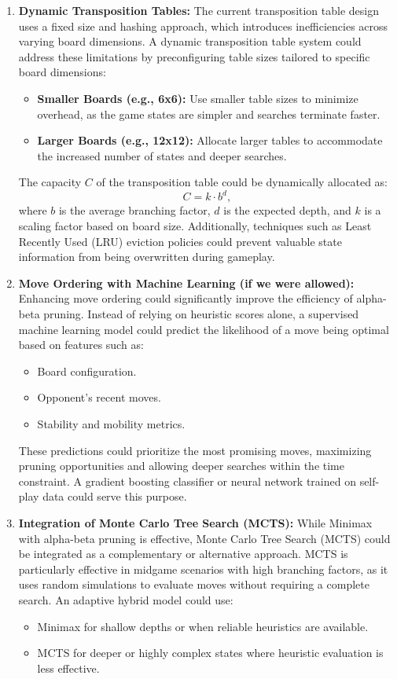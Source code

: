\documentclass[11pt]{article}
\begin{document}
\begin{enumerate}
    \item \textbf{Dynamic Transposition Tables:}
    The current transposition table design uses a fixed size and hashing approach, which introduces inefficiencies across varying board dimensions. A dynamic transposition table system could address these limitations by preconfiguring table sizes tailored to specific board dimensions:
    \begin{itemize}
        \item \textbf{Smaller Boards (e.g., 6x6):} Use smaller table sizes to minimize overhead, as the game states are simpler and searches terminate faster.
        \item \textbf{Larger Boards (e.g., 12x12):} Allocate larger tables to accommodate the increased number of states and deeper searches.
    \end{itemize}
    The capacity \(C\) of the transposition table could be dynamically allocated as:
    \[
    C = k \cdot b^d,
    \]
    where \(b\) is the average branching factor, \(d\) is the expected depth, and \(k\) is a scaling factor based on board size. Additionally, techniques such as Least Recently Used (LRU) eviction policies could prevent valuable state information from being overwritten during gameplay.

    \item \textbf{Move Ordering with Machine Learning (if we were allowed):}
    Enhancing move ordering could significantly improve the efficiency of alpha-beta pruning. Instead of relying on heuristic scores alone, a supervised machine learning model could predict the likelihood of a move being optimal based on features such as:
    \begin{itemize}
        \item Board configuration.
        \item Opponent’s recent moves.
        \item Stability and mobility metrics.
    \end{itemize}
    These predictions could prioritize the most promising moves, maximizing pruning opportunities and allowing deeper searches within the time constraint. A gradient boosting classifier or neural network trained on self-play data could serve this purpose.

    \item \textbf{Integration of Monte Carlo Tree Search (MCTS):}
    While Minimax with alpha-beta pruning is effective, Monte Carlo Tree Search (MCTS) could be integrated as a complementary or alternative approach. MCTS is particularly effective in midgame scenarios with high branching factors, as it uses random simulations to evaluate moves without requiring a complete search. An adaptive hybrid model could use:
    \begin{itemize}
        \item Minimax for shallow depths or when reliable heuristics are available.
        \item MCTS for deeper or highly complex states where heuristic evaluation is less effective.
    \end{itemize}


\end{enumerate}
\end{document}

